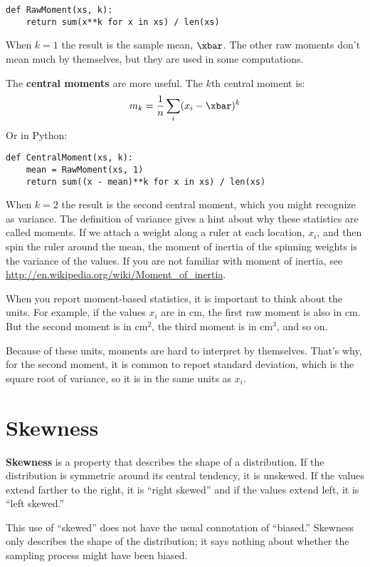 \documentclass[12pt]{book}
\begin{document}
\begin{verbatim}
def RawMoment(xs, k):
    return sum(x**k for x in xs) / len(xs)
\end{verbatim}

When $k=1$ the result is the sample mean, $\xbar$.  The other
raw moments don't mean much by themselves, but they are used
in some computations.

The {\bf central moments} are more useful.  The
$k$th central moment is:
%
\[ m_k = \frac{1}{n} \sum_i (x_i - \xbar)^k \]
%
Or in Python:

\begin{verbatim}
def CentralMoment(xs, k):
    mean = RawMoment(xs, 1)
    return sum((x - mean)**k for x in xs) / len(xs)
\end{verbatim}

When $k=2$ the result is the second central moment, which you might
recognize as variance.  The definition of variance gives a hint about
why these statistics are called moments.  If we attach a weight along a
ruler at each location, $x_i$, and then spin the ruler around
the mean, the moment of inertia of the spinning weights is the variance
of the values.  If you are not familiar with moment of inertia, see
\url{http://en.wikipedia.org/wiki/Moment_of_inertia}.  

When you report moment-based statistics, it is important to think
about the units.  For example, if the values $x_i$ are in cm, the
first raw moment is also in cm.  But the second moment is in
cm$^2$, the third moment is in cm$^3$, and so on.

Because of these units, moments are hard to interpret by themselves.
That's why, for the second moment, it is common to report standard
deviation, which is the square root of variance, so it is in the same
units as $x_i$.


\section{Skewness}

{\bf Skewness} is a property that describes the shape of a distribution.
If the distribution is symmetric around its central tendency, it is
unskewed.  If the values extend farther to the right, it is ``right
skewed'' and if the values extend left, it is ``left skewed.''

This use of ``skewed'' does not have the usual connotation of
``biased.''  Skewness only describes the shape of the distribution;
it says nothing about whether the sampling process might have been
biased.
\end{document}
